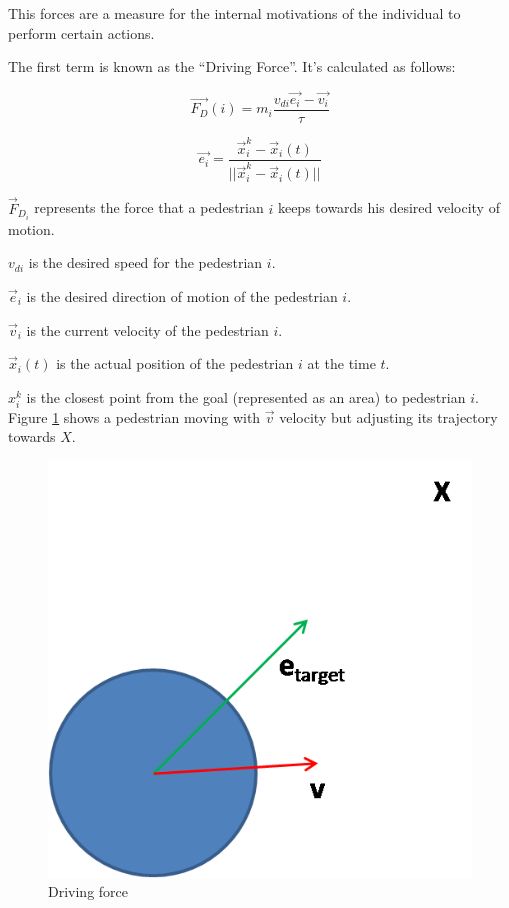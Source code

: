 \documentclass[english]{article}
\begin{document}
This forces are a measure for the internal motivations of the individual
to perform certain actions.

The first term is known as the ``Driving Force''. It's calculated
as follows:

\begin{equation}
\vec{F_{D}}(i)=m_{i}\frac{v_{di}\vec{e_{i}}-\vec{v_{i}}}{\tau}\label{eq:driving-force}
\end{equation}


\begin{equation}
\vec{e_{i}}=\frac{\vec{x}_{i}^{k}-\vec{x}_{i}(t)}{||\vec{x}_{i}^{k}-\vec{x}_{i}(t)||}\label{eq:desired-direction}
\end{equation}


$\vec{F}_{D_{i}}$ represents the force that a pedestrian $i$ keeps
towards his desired velocity of motion.

$v_{di}$ is the desired speed for the pedestrian $i$.

$\vec{e}{}_{i}$ is the desired direction of motion of the pedestrian
$i$.

$\vec{v}{}_{i}$ is the current velocity of the pedestrian $i$.

$\vec{x}_{i}(t)$ is the actual position of the pedestrian $i$ at
the time $t$.

$x_{i}^{k}$ is the closest point from the goal (represented as an
area) to pedestrian $i$. \\


Figure \ref{fig:driving-force} shows a pedestrian moving with $\vec{v}$
velocity but adjusting its trajectory towards \textbf{$X$}.

\begin{figure}[h]
\begin{centering}
\includegraphics[scale=0.4]{pics/sfm/drivingforce} 
\par\end{centering}

\caption{\label{fig:driving-force}Driving force}
\end{figure}
\end{document}
